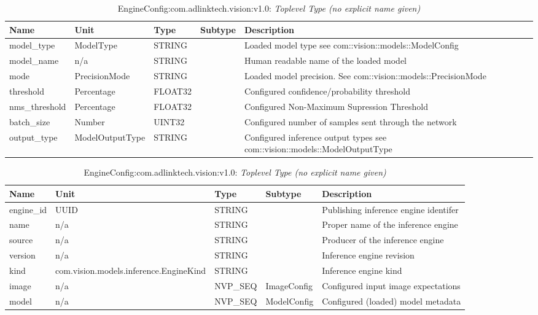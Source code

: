 \begin{table}[H]
\bigskip
\begin{tabularx}{\textwidth}{l l l l X} 
	 \textbf{Name} & \textbf{Unit} & \textbf{Type} & \textbf{Subtype} & \textbf{Description} \\
	 \midrule
   model\_type & ModelType & STRING &  & Loaded model type see com::vision::models::ModelConfig \\
   model\_name & n/a & STRING &  & Human readable name of the loaded model \\
   mode & PrecisionMode & STRING &  & Loaded model precision. See com::vision::models::PrecisionMode \\
   threshold & Percentage & FLOAT32 &  & Configured confidence/probability threshold \\
   nms\_threshold & Percentage & FLOAT32 &  & Configured Non-Maximum Supression Threshold \\
   batch\_size & Number & UINT32 &  & Configured number of samples sent through the network \\
   output\_type & ModelOutputType & STRING &  & Configured inference output types see com::vision::models::ModelOutputType \\
\end{tabularx}
\caption{EngineConfig:com.adlinktech.vision:v1.0: ModelConfig}\label{EngineConfigTagGroup.json:table:EngineConfig-ModelConfig}

\bigskip
\begin{tabularx}{\textwidth}{l l l l X} 
	 \textbf{Name} & \textbf{Unit} & \textbf{Type} & \textbf{Subtype} & \textbf{Description} \\
	 \midrule
   engine\_id & UUID & STRING &  & Publishing inference engine identifer \\
   name & n/a & STRING &  & Proper name of the inference engine \\
   source & n/a & STRING &  & Producer of the inference engine \\
   version & n/a & STRING &  & Inference engine revision \\
   kind & com.vision.models.inference.EngineKind & STRING &  & Inference engine kind \\
   image & n/a & NVP\_SEQ & ImageConfig & Configured input image expectations \\
   model & n/a & NVP\_SEQ & ModelConfig & Configured (loaded) model metadata \\
\end{tabularx}
\caption{EngineConfig:com.adlinktech.vision:v1.0: \textit{Toplevel Type (no explicit name given)}}\label{EngineConfigTagGroup.json:table:EngineConfig-no-type-given}


\end{table}

